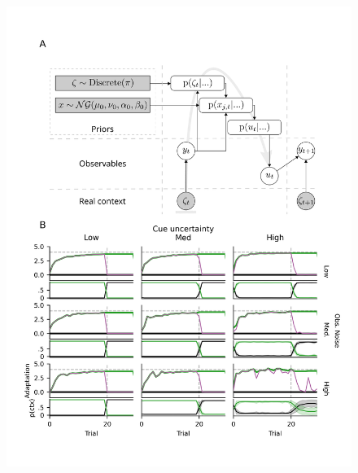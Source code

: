 \documentclass[a4paper,doc,floatsintext,natbib]{apa6}%
\begin{document}
\begin{figure}
\centering
\includegraphics[]{./figures/figure_1.png}

\end{figure}
\end{document}
